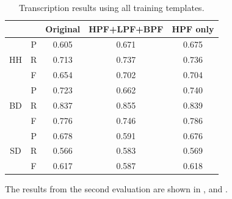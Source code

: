 \documentclass{article}
\begin{document}
\begin{table}[h]
\begin{center}
\begin{tabular}{|c|c|c|c|c|}
\hline
\multicolumn{2}{|c|}{}  & Original & HPF+LPF+BPF & HPF only \\ \hline
\multirow{3}{*}{HH} & P & 0.605    & 0.671       & 0.675    \\ \cline{2-5} 
                    & R & 0.713    & 0.737       & 0.736    \\ \cline{2-5} 
                    & F & 0.654    & 0.702       & 0.704    \\ \hline
\multirow{3}{*}{BD} & P & 0.723    & 0.662       & 0.740    \\ \cline{2-5} 
                    & R & 0.837    & 0.855       & 0.839    \\ \cline{2-5} 
                    & F & 0.776    & 0.746       & 0.786    \\ \hline
\multirow{3}{*}{SD} & P & 0.678    & 0.591       & 0.676    \\ \cline{2-5} 
                    & R & 0.566    & 0.583       & 0.569    \\ \cline{2-5} 
                    & F & 0.617    & 0.587       & 0.618    \\ \hline
\end{tabular}
\end{center}
 \caption{Transcription results using all training templates.}
 \label{tab:basicResults}
\end{table}

The results from the second evaluation are shown in ,  and . 
\end{document}
